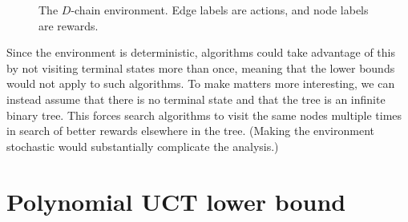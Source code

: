 \documentclass[a4paper]{article}
\begin{document}
\begin{figure}
    \centering

\def\D{6}


    \caption{The $D$-chain environment. Edge labels are actions,
    and node labels are rewards.}
    \label{fig:D-chain}
\end{figure}

\begin{remark}
Since the environment is deterministic, algorithms could take advantage of this by not visiting terminal states more than once, meaning that the lower bounds would not apply to such algorithms.
To make matters more interesting, we can instead assume that there is no terminal state and that the tree is an infinite binary tree.
This forces search algorithms to visit the same nodes multiple times in search of better rewards elsewhere in the tree.
(Making the environment stochastic would substantially complicate the analysis.)
\end{remark}

\section{Polynomial UCT lower bound}
\end{document}
